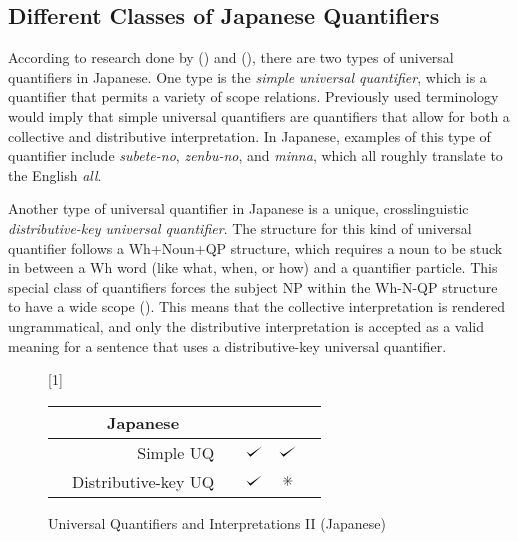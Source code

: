 \documentclass[english, 11pt]{article}
\newcommand{\dwork}{\text{\ding{83}}}
\def\checkmark{\tikz\fill[scale=0.4](0,.35) -- (.25,0) -- (1,.7) -- (.25,.15) -- cycle;}
\begin{document}
\subsection{Different Classes of Japanese Quantifiers}
According to research done by (\cite{s1}) and (\cite{s1}), there are two types of universal quantifiers in Japanese. One type is the \emph{simple universal quantifier}, which is a quantifier that permits a variety of scope relations. Previously used terminology would imply that simple universal quantifiers are quantifiers that allow for both a collective and distributive interpretation. In Japanese, examples of this type of quantifier include \emph{subete-no}, \emph{zenbu-no}, and \emph{minna}, which all roughly translate to the English \emph{all}. 

Another type of universal quantifier in Japanese is a unique, crosslinguistic \emph{distributive-key universal quantifier}. The structure for this kind of universal quantifier follows a Wh+Noun+QP structure, which requires a noun to be stuck in between a Wh word (like what, when, or how) and a quantifier particle. This special class of quantifiers forces the subject NP within the Wh-N-QP structure to have a wide scope (\cite{s3}). This means that the collective interpretation is rendered ungrammatical, and only the distributive interpretation is accepted as a valid meaning for a sentence that uses a distributive-key universal quantifier.

\begin{figure}[h]
	\begin{center} \renewcommand*\arraystretch{1.2}
	\scalebox{1}[1]{\begin{tabular}[t]{|rrl||c|c|c|} \hline 
	\multicolumn{3}{|c||}{Japanese} & \sc{Distributive} & \sc{Collective}  \\[0.5ex]
  	 	\hline & Simple UQ 		& & $\checkmark$ & $\checkmark$ \\
		\hline & Distributive-key UQ & & $\checkmark$ & $\dwork$ \\
   	 	\hline 
	\end{tabular}} \renewcommand*\arraystretch{1} \end{center}
	\vspace*{-5mm}
	\captionsetup{labelfont=bf}
	\caption[labelfont=bf]{Universal Quantifiers and Interpretations II (Japanese)}
\end{figure}
\end{document}

